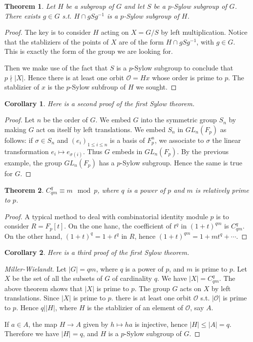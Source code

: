 \documentclass{article}
\newtheorem{Thm}{Theorem}[section]
\newtheorem{corollary}{Corollary}[Thm]
\theoremstyle{definition}
\begin{document}
\begin{Thm}
Let $H$ be a subgroup of $G$ and let $S$ be a $p$-Sylow subgroup of $G$. There exists $g\in G$ s.t. $H\cap gSg^{-1}$ is a $p$-Sylow subgroup of $H$.
\end{Thm}
\begin{proof}
The key is to consider $H$ acting on $X=G/S$ by left multiplication. Notice that the stabliziers of the points of $X$ are of the form $H\cap gSg^{-1}$, with $g\in G$.
This is exactly the form of the group we are looking for.\par 
Then we make use of the fact that $S$ is a $p$-Sylow subgroup to conclude that $p\nmid \left|X\right|$. Hence there is at least one orbit $\mathcal{O}=Hx$ whose order is prime to $p$.
The stablizier of $x$ is the $p$-Sylow subfroup of $H$ we sought.
\end{proof}
\begin{corollary}
Here is a second proof of the first Sylow theorem.
\end{corollary}
\begin{proof}
Let $n$ be the order of $G$. We embed $G$ into the symmetric group $S_n$ by making $G$ act on itself by left translations.
We embed $S_n$ in $GL_n(F_p)$ as follows: if $\sigma\in S_n$ and $(e_i)_{1\le i\le n}$ is a basis of $F_p^n$, we associate to $\sigma$ the linear transformation $e_i\mapsto e_{\sigma(i)}$.
Thus $G$ embeds in $GL_n(F_p)$. By the previous example, the group $GL_n(F_p)$ has a $p$-Sylow subgroup. Hence the same is true for $G$.
\end{proof}

\begin{Thm}
$C_{qm}^q\equiv m \mod{p}$, where $q$ is a power of $p$ and $m$ is relatively prime to $p$.
\end{Thm}
\begin{proof}
A typical method to deal with combinatorial identity module $p$ is to consider $R=F_p\left[t\right]$. On the one hanc, the coefficient of $t^q$ in $(1+t)^{qm}$ is $C_{qm}^q$.
On the other hand, $(1+t)^q=1+t^q$ in $R$, hence $(1+t)^{qm}=1+mt^q+\cdots$.
\end{proof}
\begin{corollary}
Here is a third proof of the first Sylow theorem.
\end{corollary}
\begin{proof}[Miller-Wielandt]
Let $\left|G\right|=qm$, where $q$ is a power of $p$, and $m$ is prime to $p$. Let $X$ be the set of all the subsets of $G$ of cardinality $q$. We have $\left|X\right|=C_{qm}^{q}$.
The above theorem shows that $\left|X\right|$ is prime to $p$. The group $G$ acts on $X$ by left translations. Since $\left|X\right|$ is prime to $p$. there is at least one orbit $\mathcal{O}$ s.t. $\left|\mathcal{O}\right|$ is prime to $p$.
Hence $q|\left|H\right|$, where $H$ is the stablizier of an element of $\mathcal{O}$, say $A$.\par 
If $a\in A$, the map $H\to A$ given by $h\mapsto ha$ is injective, hence $\left|H\right|\le \left|A\right|=q$. Therefore we have $\left|H\right|=q$, and $H$ is a $p$-Sylow subgroup of $G$.
\end{proof}
\end{document}
